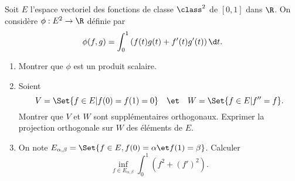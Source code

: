 \begin{enonce}
\begin{exercise}[ID={RMS127 E697},subtitle={Mines-Ponts PSI 2016},tags={}]
Soit $E$ l'espace vectoriel des fonctions de classe $\class^2$ de $[0,1]$ dans $\R$.
On considère $\phi:E^2\to\R$ définie par
\begin{equation*}
  \phi(f,g) = \int_0^1 \left( f(t)g(t) + f'(t)g'(t) \right)\d t.
\end{equation*}

\begin{enumerate}
  \item Montrer que $\phi$ est un produit scalaire.

  \item Soient
    \begin{equation*}
      V=\Set{f\in E | f(0) = f(1) = 0}
      \quad\et\quad
      W=\Set{f\in E | f'' = f}.
    \end{equation*}
    Montrer que $V$ et $W$ sont supplémentaires orthogonaux.
    Exprimer la projection orthogonale sur $W$ des éléments de $E$.

  \item On note $E_{\alpha,\beta} = \Set{f\in E, f(0) = \alpha \et f(1)=\beta}$.
    Calculer
    \begin{equation*}
      \inf_{f\in E_{\alpha,\beta}} \int_0^1 \left( f^2 + \left( f' \right)^2 \right).
    \end{equation*}
\end{enumerate}
\end{exercise}
\begin{solution}
\end{solution}
\end{enonce}
